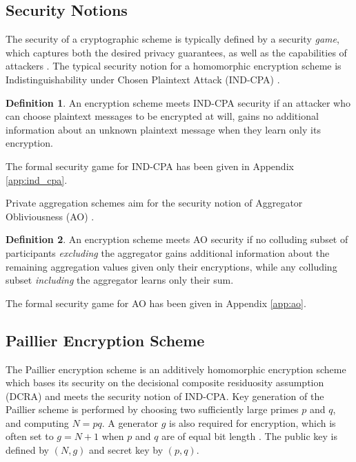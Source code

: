 \documentclass[10pt,journal,compsoc]{IEEEtran}
\theoremstyle{definition}
\newtheorem{definition}{Definition}[section]
\theoremstyle{definition}
\theoremstyle{remark}
\begin{document}
\subsection{Security Notions}
The security of a cryptographic scheme is typically defined by a security \textit{game}, which captures both the desired privacy guarantees, as well as the capabilities of attackers \cite{katzIntroductionModernCryptography2008}. The typical security notion for a homomorphic encryption scheme is Indistinguishability under Chosen Plaintext Attack (IND-CPA) \cite{chaseSecurityHomomorphicEncryption2017}. 
\begin{definition}
An encryption scheme meets IND-CPA security if an attacker who can choose plaintext messages to be encrypted at will, gains no additional information about an unknown plaintext message when they learn only its encryption. 

The formal security game for IND-CPA has been given in Appendix \ref{app:ind_cpa}.
\end{definition}
Private aggregation schemes aim for the security notion of Aggregator Obliviousness (AO) \cite{shiPrivacyPreservingAggregationTimeSeries2011}. 
\begin{definition}
An encryption scheme meets AO security if no colluding subset of participants \textit{excluding} the aggregator gains additional information about the remaining aggregation values given only their encryptions, while any colluding subset \textit{including} the aggregator learns only their sum. 

The formal security game for AO has been given in Appendix \ref{app:ao}.
\end{definition}

% 
% 

\subsection{Paillier Encryption Scheme} \label{subsec:paillier_scheme}
The Paillier encryption scheme \cite{paillierPublicKeyCryptosystemsBased1999} is an additively homomorphic encryption scheme which bases its security on the decisional composite residuosity assumption (DCRA) and meets the security notion of IND-CPA. Key generation of the Paillier scheme is performed by choosing two sufficiently large primes $p$ and $q$, and computing $N=pq$. A generator $g$ is also required for encryption, which is often set to $g=N+1$ when $p$ and $q$ are of equal bit length \cite{katzIntroductionModernCryptography2008}. The public key is defined by $(N, g)$ and secret key by $(p, q)$.
\end{document}
